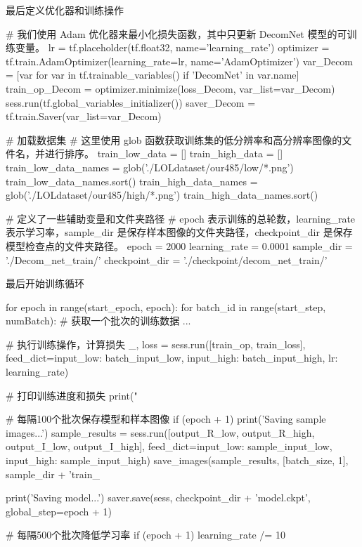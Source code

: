 \documentclass[letterpaper,12pt]{article}
\begin{document}
			最后定义优化器和训练操作
			
			\begin{python}
			# 我们使用 Adam 优化器来最小化损失函数，其中只更新 DecomNet 模型的可训练变量。
			lr = tf.placeholder(tf.float32, name='learning_rate')
			optimizer = tf.train.AdamOptimizer(learning_rate=lr, name='AdamOptimizer')
			var_Decom = [var for var in tf.trainable_variables() if 'DecomNet' in var.name]
			train_op_Decom = optimizer.minimize(loss_Decom, var_list=var_Decom)
			sess.run(tf.global_variables_initializer())
			saver_Decom = tf.train.Saver(var_list=var_Decom)
				
			# 加载数据集
			# 这里使用 glob 函数获取训练集的低分辨率和高分辨率图像的文件名，并进行排序。
			train_low_data = []
			train_high_data = []
			train_low_data_names = glob('./LOLdataset/our485/low/*.png') 
			train_low_data_names.sort()
			train_high_data_names = glob('./LOLdataset/our485/high/*.png') 
			train_high_data_names.sort()
			
			# 定义了一些辅助变量和文件夹路径
			# epoch 表示训练的总轮数，learning_rate 表示学习率，sample_dir 是保存样本图像的文件夹路径，checkpoint_dir 是保存模型检查点的文件夹路径。
			epoch = 2000
			learning_rate = 0.0001
			sample_dir = './Decom_net_train/'
			checkpoint_dir = './checkpoint/decom_net_train/'
			\end{python}
			
				最后开始训练循环
			
			\begin{python}
				for epoch in range(start_epoch, epoch):
				for batch_id in range(start_step, numBatch):
				# 获取一个批次的训练数据
				...
				
				# 执行训练操作，计算损失
				_, loss = sess.run([train_op, train_loss], feed_dict={input_low: batch_input_low, input_high: batch_input_high, lr: learning_rate})
				
				# 打印训练进度和损失
				print("%
				
				# 每隔100个批次保存模型和样本图像
				if (epoch + 1) %
				print('Saving sample images...')
				sample_results = sess.run([output_R_low, output_R_high, output_I_low, output_I_high], feed_dict={input_low: sample_input_low, input_high: sample_input_high})
				save_images(sample_results, [batch_size, 1], sample_dir + 'train_%
				
				print('Saving model...')
				saver.save(sess, checkpoint_dir + 'model.ckpt', global_step=epoch + 1)
				
				# 每隔500个批次降低学习率
				if (epoch + 1) %
				learning_rate /= 10
			\end{python}
			
\end{document}
